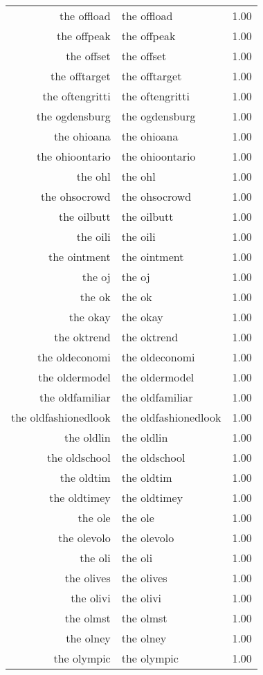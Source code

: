 \begin{table}[ht]
\begin{tabular}{rlr}
  the offload & the offload & 1.00 \\ 
  the offpeak & the offpeak & 1.00 \\ 
  the offset & the offset & 1.00 \\ 
  the offtarget & the offtarget & 1.00 \\ 
  the oftengritti & the oftengritti & 1.00 \\ 
  the ogdensburg & the ogdensburg & 1.00 \\ 
  the ohioana & the ohioana & 1.00 \\ 
  the ohioontario & the ohioontario & 1.00 \\ 
  the ohl & the ohl & 1.00 \\ 
  the ohsocrowd & the ohsocrowd & 1.00 \\ 
  the oilbutt & the oilbutt & 1.00 \\ 
  the oili & the oili & 1.00 \\ 
  the ointment & the ointment & 1.00 \\ 
  the oj & the oj & 1.00 \\ 
  the ok & the ok & 1.00 \\ 
  the okay & the okay & 1.00 \\ 
  the oktrend & the oktrend & 1.00 \\ 
  the oldeconomi & the oldeconomi & 1.00 \\ 
  the oldermodel & the oldermodel & 1.00 \\ 
  the oldfamiliar & the oldfamiliar & 1.00 \\ 
  the oldfashionedlook & the oldfashionedlook & 1.00 \\ 
  the oldlin & the oldlin & 1.00 \\ 
  the oldschool & the oldschool & 1.00 \\ 
  the oldtim & the oldtim & 1.00 \\ 
  the oldtimey & the oldtimey & 1.00 \\ 
  the ole & the ole & 1.00 \\ 
  the olevolo & the olevolo & 1.00 \\ 
  the oli & the oli & 1.00 \\ 
  the olives & the olives & 1.00 \\ 
  the olivi & the olivi & 1.00 \\ 
  the olmst & the olmst & 1.00 \\ 
  the olney & the olney & 1.00 \\ 
  the olympic & the olympic & 1.00 \\ 

\end{tabular}
\end{table}
